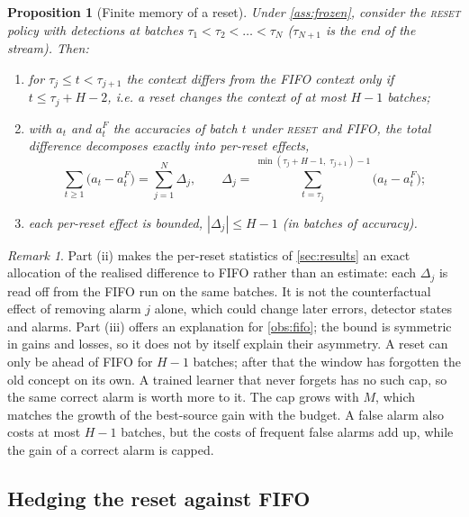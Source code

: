 \documentclass[10pt]{article}
\newtheorem{proposition}{Proposition}
\theoremstyle{definition}
\theoremstyle{remark}
\newtheorem{remark}{Remark}
\newcommand{\full}{\textup{\textsc{reset}}}
\begin{document}
\begin{proposition}[Finite memory of a reset]
\label{prop:memory}
Under \cref{ass:frozen}, consider the \full{} policy with detections at batches $\tau_1<\tau_2<\dots<\tau_N$ ($\tau_{N+1}$ is the end of the stream). Then:
\begin{enumerate}\renewcommand{\theenumi}{\roman{enumi}}\renewcommand{\labelenumi}{(\theenumi)}
\item for $\tau_j\le t<\tau_{j+1}$ the context differs from the FIFO context only if $t\le\tau_j+H-2$, i.e. a reset
  changes the context of at most $H-1$ batches;
\item with $a_t$ and $a^F_t$ the accuracies of batch $t$ under \full{} and FIFO, the total difference decomposes
  exactly into per-reset effects,
  \begin{equation}
    \sum_{t\ge1}\bigl(a_t-a^F_t\bigr)=\sum_{j=1}^{N}\Delta_j,\qquad
    \Delta_j=\sum_{t=\tau_j}^{\min(\tau_j+H-1,\;\tau_{j+1})-1}\bigl(a_t-a^F_t\bigr);
  \end{equation}
\item each per-reset effect is bounded, $|\Delta_j|\le H-1$ (in batches of accuracy).
\end{enumerate}
\end{proposition}

\begin{remark}
Part (ii) makes the per-reset statistics of \cref{sec:results} an exact allocation of the realised difference to FIFO
rather than an estimate: each $\Delta_j$ is read off from the FIFO run on the same batches. It is not the
counterfactual effect of removing alarm $j$ alone, which could change later errors, detector states and alarms. Part
(iii) offers an explanation for \cref{obs:fifo}; the bound is symmetric in gains and losses, so it does not by itself
explain their asymmetry. A reset
can only be ahead of FIFO for $H-1$ batches; after that the window has forgotten the old concept on its own. A trained
learner that never forgets has no such cap, so the same correct alarm is worth more to it. The cap grows with $M$,
which matches the growth of the best-source gain with the budget. A false alarm also costs at most $H-1$ batches, but
the costs of frequent false alarms add up, while the gain of a correct alarm is capped.
\end{remark}

\subsection{Hedging the reset against FIFO}
\label{sec:hedge}
\end{document}
